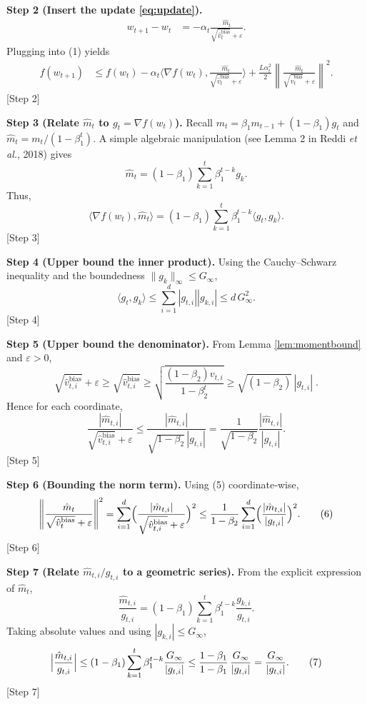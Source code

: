 \documentclass{article}
\newcommand{\norm}[1]{\left\|#1\right\|}
\newcommand{\inner}[2]{\langle #1,#2\rangle}
\begin{document}
\noindent\textbf{Step 2 (Insert the update \eqref{eq:update}).}
\begin{align}
    w_{t+1}-w_{t}
    &= -\alpha_{t}\frac{\hat m_{t}}{\sqrt{\hat v_{t}^{\text{bias}}}+\varepsilon} .
\end{align}
Plugging into (1) yields
\begin{align}
    f(w_{t+1}) 
    &\le f(w_{t})-\alpha_{t}\inner{\nabla f(w_{t})}{\frac{\hat m_{t}}{\sqrt{\hat v_{t}^{\text{bias}}}+\varepsilon}}
        +\frac{L\alpha_{t}^{2}}{2}\norm{\frac{\hat m_{t}}{\sqrt{\hat v_{t}^{\text{bias}}}+\varepsilon}}^{2}. \tag{2}
\end{align}
[Step 2]

\noindent\textbf{Step 3 (Relate $\hat m_{t}$ to $g_{t}=\nabla f(w_{t})$).}
Recall $m_{t}= \beta_{1}m_{t-1}+(1-\beta_{1})g_{t}$ and $\hat m_{t}=m_{t}/(1-\beta_{1}^{t})$.
A simple algebraic manipulation (see Lemma 2 in Reddi \emph{et al.}, 2018) gives
\[
\hat m_{t}= (1-\beta_{1})\sum_{k=1}^{t}\beta_{1}^{t-k} g_{k}.
\]
Thus,
\[
\inner{\nabla f(w_{t})}{\hat m_{t}}
= (1-\beta_{1})\sum_{k=1}^{t}\beta_{1}^{t-k}\inner{g_{t}}{g_{k}}. \tag{3}
\]
[Step 3]

\noindent\textbf{Step 4 (Upper bound the inner product).}
Using the Cauchy–Schwarz inequality and the boundedness $\|g_{k}\|_{\infty}\le G_{\infty}$,
\[
\inner{g_{t}}{g_{k}} \le \sum_{i=1}^{d}|g_{t,i}||g_{k,i}|
\le d\, G_{\infty}^{2}. \tag{4}
\]
[Step 4]

\noindent\textbf{Step 5 (Upper bound the denominator).}
From Lemma \ref{lem:momentbound} and $\varepsilon>0$,
\[
\sqrt{\hat v_{t,i}^{\text{bias}}}+\varepsilon \ge \sqrt{\hat v_{t,i}^{\text{bias}}}
\ge \sqrt{\frac{(1-\beta_{2})v_{t,i}}{1-\beta_{2}^{t}}}
\ge \sqrt{(1-\beta_{2})}\,|g_{t,i}|\; .
\]
Hence for each coordinate,
\[
\frac{| \hat m_{t,i}|}{\sqrt{\hat v_{t,i}^{\text{bias}}}+\varepsilon}
\le \frac{| \hat m_{t,i}|}{\sqrt{1-\beta_{2}}\,|g_{t,i}|}
= \frac{1}{\sqrt{1-\beta_{2}}}\frac{| \hat m_{t,i}|}{|g_{t,i}|}. \tag{5}
\]
[Step 5]

\noindent\textbf{Step 6 (Bounding the norm term).}
Using (5) coordinate‑wise,
\[
\norm{\frac{\hat m_{t}}{\sqrt{\hat v_{t}^{\text{bias}}}+\varepsilon}}^{2}
= \sum_{i=1}^{d}\Bigl(\frac{|\hat m_{t,i}|}{\sqrt{\hat v_{t,i}^{\text{bias}}}+\varepsilon}\Bigr)^{2}
\le \frac{1}{1-\beta_{2}}\sum_{i=1}^{d}\Bigl(\frac{|\hat m_{t,i}|}{|g_{t,i}|}\Bigr)^{2}. \tag{6}
\]
[Step 6]

\noindent\textbf{Step 7 (Relate $\hat m_{t,i}/g_{t,i}$ to a geometric series).}
From the explicit expression of $\hat m_{t}$,
\[
\frac{\hat m_{t,i}}{g_{t,i}}
= (1-\beta_{1})\sum_{k=1}^{t}\beta_{1}^{t-k}\frac{g_{k,i}}{g_{t,i}}.
\]
Taking absolute values and using $|g_{k,i}|\le G_{\infty}$,
\[
\Bigl|\frac{\hat m_{t,i}}{g_{t,i}}\Bigr|
\le (1-\beta_{1})\sum_{k=1}^{t}\beta_{1}^{t-k}\frac{G_{\infty}}{|g_{t,i}|}
\le \frac{1-\beta_{1}}{1-\beta_{1}}\,\frac{G_{\infty}}{|g_{t,i}|}
= \frac{G_{\infty}}{|g_{t,i}|}. \tag{7}
\]
[Step 7]
\end{document}
